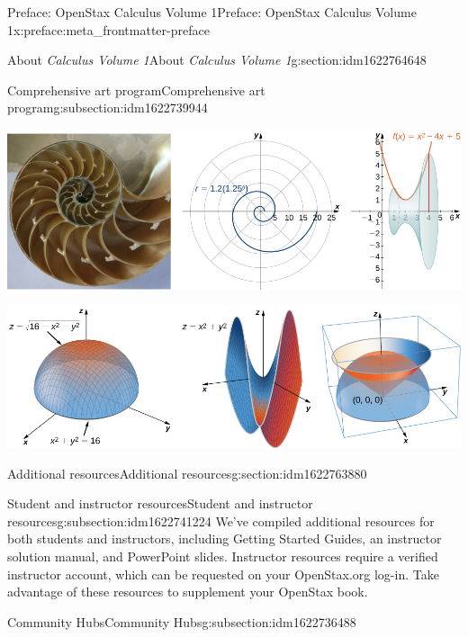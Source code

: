 \documentclass[oneside,10pt,]{book}
\numberwithin{equation}{section}
\begin{document}
\begin{preface}{Preface: OpenStax Calculus Volume 1}{}{Preface: OpenStax Calculus Volume 1}{}{}{x:preface:meta_frontmatter-preface}
\begin{sectionptx}{About \emph{Calculus Volume 1}}{}{About \emph{Calculus Volume 1}}{}{}{g:section:idm1622764648}
\begin{subsectionptx}{Comprehensive art program}{}{Comprehensive art program}{}{}{g:subsection:idm1622739944}
\begin{image}{0.25}{0.5}{0.25}
\includegraphics[width=\linewidth]{external/CNX_Calc_Figure_Preface_001_img.jpg}
\end{image}%
\begin{image}{0.25}{0.5}{0.25}%
\includegraphics[width=\linewidth]{external/CNX_Calc_Figure_Preface_002_img.jpg}
\end{image}%
\end{subsectionptx}
\end{sectionptx}
%
%
\typeout{************************************************}
\typeout{************************************************}
%
\begin{sectionptx}{Additional resources}{}{Additional resources}{}{}{g:section:idm1622763880}
%
%
\typeout{************************************************}
\typeout{************************************************}
%
\begin{subsectionptx}{Student and instructor resources}{}{Student and instructor resources}{}{}{g:subsection:idm1622741224}
We’ve compiled additional resources for both students and instructors, including Getting Started Guides, an instructor solution manual, and PowerPoint slides. Instructor resources require a verified instructor account, which can be requested on your OpenStax.org log-in. Take advantage of these resources to supplement your OpenStax book.%
\end{subsectionptx}
%
%
\typeout{************************************************}
\typeout{************************************************}
%
\begin{subsectionptx}{Community Hubs}{}{Community Hubs}{}{}{g:subsection:idm1622736488}

\end{subsectionptx}
\end{sectionptx}
\end{preface}
\end{document}
